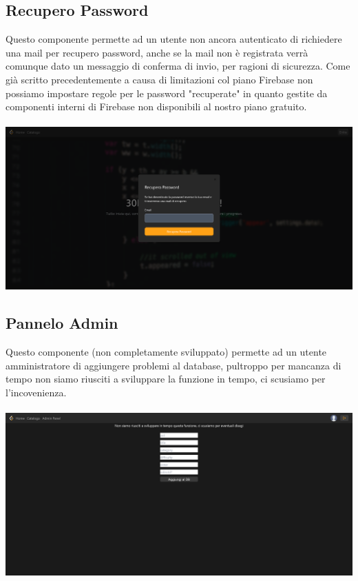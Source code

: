 \documentclass[11pt, a4paper]{article}
\theoremstyle{definition}
\begin{document}
\subsection{Recupero Password}
Questo componente permette ad un utente non ancora autenticato di richiedere una mail per recupero password, anche se la mail non è registrata verrà comunque dato un messaggio di conferma di invio, per ragioni di sicurezza. Come già scritto precedentemente
a causa di limitazioni col piano Firebase non possiamo impostare regole per le password "recuperate" in quanto gestite da componenti interni di Firebase non disponibili al nostro piano gratuito.\\\\
\includegraphics[width=\textwidth]{materiale/sito/Recupero Pw.png}
\newpage
\subsection{Pannelo Admin}
Questo componente (non completamente sviluppato) permette ad un utente amministratore di aggiungere problemi al database, pultroppo per mancanza di tempo non siamo riusciti a sviluppare la funzione in tempo, ci scusiamo per l'incovenienza.\\\\
\includegraphics[width=\textwidth]{materiale/sito/Pannello Admin.png}
\newpage
\end{document}
